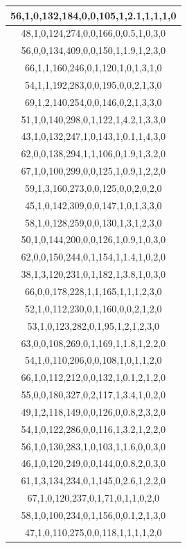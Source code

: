 \documentclass{article}
\begin{document}
\begin{table}[h!]
\begin{tabular}{|c|}
56,1,0,132,184,0,0,105,1,2.1,1,1,1,0 \\ \hline
48,1,0,124,274,0,0,166,0,0.5,1,0,3,0 \\ \hline
56,0,0,134,409,0,0,150,1,1.9,1,2,3,0 \\ \hline
66,1,1,160,246,0,1,120,1,0,1,3,1,0 \\ \hline
54,1,1,192,283,0,0,195,0,0,2,1,3,0 \\ \hline
69,1,2,140,254,0,0,146,0,2,1,3,3,0 \\ \hline
51,1,0,140,298,0,1,122,1,4.2,1,3,3,0 \\ \hline
43,1,0,132,247,1,0,143,1,0.1,1,4,3,0 \\ \hline
62,0,0,138,294,1,1,106,0,1.9,1,3,2,0 \\ \hline
67,1,0,100,299,0,0,125,1,0.9,1,2,2,0 \\ \hline
59,1,3,160,273,0,0,125,0,0,2,0,2,0 \\ \hline
45,1,0,142,309,0,0,147,1,0,1,3,3,0 \\ \hline
58,1,0,128,259,0,0,130,1,3,1,2,3,0 \\ \hline
50,1,0,144,200,0,0,126,1,0.9,1,0,3,0 \\ \hline
62,0,0,150,244,0,1,154,1,1.4,1,0,2,0 \\ \hline
38,1,3,120,231,0,1,182,1,3.8,1,0,3,0 \\ \hline
66,0,0,178,228,1,1,165,1,1,1,2,3,0 \\ \hline
52,1,0,112,230,0,1,160,0,0,2,1,2,0 \\ \hline
53,1,0,123,282,0,1,95,1,2,1,2,3,0 \\ \hline
63,0,0,108,269,0,1,169,1,1.8,1,2,2,0 \\ \hline
54,1,0,110,206,0,0,108,1,0,1,1,2,0 \\ \hline
66,1,0,112,212,0,0,132,1,0.1,2,1,2,0 \\ \hline
55,0,0,180,327,0,2,117,1,3.4,1,0,2,0 \\ \hline
49,1,2,118,149,0,0,126,0,0.8,2,3,2,0 \\ \hline
54,1,0,122,286,0,0,116,1,3.2,1,2,2,0 \\ \hline
56,1,0,130,283,1,0,103,1,1.6,0,0,3,0 \\ \hline
46,1,0,120,249,0,0,144,0,0.8,2,0,3,0 \\ \hline
61,1,3,134,234,0,1,145,0,2.6,1,2,2,0 \\ \hline
67,1,0,120,237,0,1,71,0,1,1,0,2,0 \\ \hline
58,1,0,100,234,0,1,156,0,0.1,2,1,3,0 \\ \hline
47,1,0,110,275,0,0,118,1,1,1,1,2,0 \\ \hline

\end{tabular}
\end{table}
\end{document}
